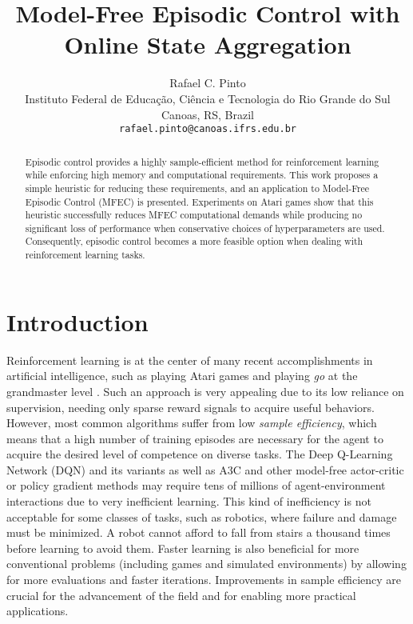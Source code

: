 \documentclass{article}
\title{Model-Free Episodic Control with Online State Aggregation}
\author{
  Rafael C. Pinto \\
  Instituto Federal de Educação, Ciência e Tecnologia do Rio Grande do Sul\\
  Canoas, RS, Brazil \\
  \texttt{rafael.pinto@canoas.ifrs.edu.br} \\
}
\begin{document}
\maketitle

\begin{abstract}
Episodic control provides a highly sample-efficient method for reinforcement learning while enforcing high memory and computational requirements. This work proposes a simple heuristic for reducing these requirements, and an application to Model-Free Episodic Control (MFEC) is presented. Experiments on Atari games show that this heuristic successfully reduces MFEC computational demands while producing no significant loss of performance when conservative choices of hyperparameters are used. Consequently, episodic control becomes a more feasible option when dealing with reinforcement learning tasks.

\end{abstract}




\section{Introduction}

Reinforcement learning is at the center of many recent accomplishments in artificial intelligence, such as playing Atari games \cite{mnih2015human} and playing \emph{go} at the grandmaster level \cite{silver2016mastering}. Such an approach is very appealing due to its low reliance on supervision, needing only sparse reward signals to acquire useful behaviors. However, most common algorithms suffer from low \emph{sample efficiency}, which means that a high number of training episodes are necessary for the agent to acquire the desired level of competence on diverse tasks. The Deep Q-Learning Network (DQN) \cite{mnih2013playing} and its variants \cite{wang2015dueling,hessel2018rainbow} as well as A3C \cite{mnih2016asynchronous} and other model-free actor-critic or policy gradient methods \cite{schulman2017proximal} may require tens of millions of agent-environment interactions due to very inefficient learning. This kind of inefficiency is not acceptable for some classes of tasks, such as robotics, where failure and damage must be minimized. A robot cannot afford to fall from stairs a thousand times before learning to avoid them. Faster learning is also beneficial for more conventional problems (including games and simulated environments) by allowing for more evaluations and faster iterations. Improvements in sample efficiency are crucial for the advancement of the field and for enabling more practical applications.
\end{document}
